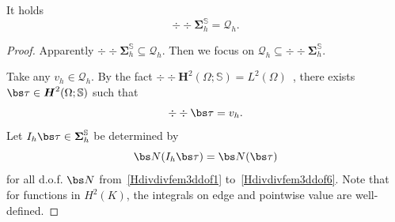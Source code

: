 \begin{lemma}\label{lem:divdivonto}
It holds
$$
\div\div\boldsymbol\Sigma_h^{\mathbb S}=\mathcal Q_h.
$$
\end{lemma}
\begin{proof}
Apparently $\div\div\boldsymbol\Sigma_h^{\mathbb S}\subseteq\mathcal Q_h$. Then we focus on $\mathcal Q_h\subseteq\div\div\boldsymbol\Sigma_h^{\mathbb S}$.

Take any $v_h\in\mathcal Q_h$.  By the fact $\div\div \boldsymbol H^2(\Omega;\mathbb S)=L^2(\Omega)$~\cite{CostabelMcIntosh2010}, 
there exists $\bs\tau\in\boldsymbol H^2(\Omega;\mathbb S)$ such that
\[
\div\div\bs\tau=v_h. %
\]
Let $I_h{\bs\tau}\in\boldsymbol\Sigma_h^{\mathbb S}$ be determined by 
$$
\bs N (I_h\bs \tau) = \bs N(\bs \tau)
$$
for all d.o.f. $\bs N$ from~\eqref{Hdivdivfem3ddof1} to~\eqref{Hdivdivfem3ddof6}.
Note that for functions in $H^2(K)$, the integrals on edge and pointwise value are well-defined.

\end{proof}
